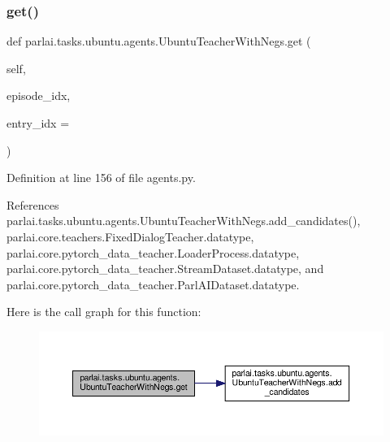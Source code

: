 \subsubsection{\texorpdfstring{get()}{get()}}
{\footnotesize\ttfamily def parlai.\+tasks.\+ubuntu.\+agents.\+Ubuntu\+Teacher\+With\+Negs.\+get (\begin{DoxyParamCaption}\item[{}]{self,  }\item[{}]{episode\+\_\+idx,  }\item[{}]{entry\+\_\+idx = {} }\end{DoxyParamCaption})}



Definition at line 156 of file agents.\+py.



References parlai.\+tasks.\+ubuntu.\+agents.\+Ubuntu\+Teacher\+With\+Negs.\+add\+\_\+candidates(), parlai.\+core.\+teachers.\+Fixed\+Dialog\+Teacher.\+datatype, parlai.\+core.\+pytorch\+\_\+data\+\_\+teacher.\+Loader\+Process.\+datatype, parlai.\+core.\+pytorch\+\_\+data\+\_\+teacher.\+Stream\+Dataset.\+datatype, and parlai.\+core.\+pytorch\+\_\+data\+\_\+teacher.\+Parl\+A\+I\+Dataset.\+datatype.

Here is the call graph for this function\+:
\nopagebreak
\begin{figure}[H]
\begin{center}
\leavevmode
\includegraphics[width=350pt]{classparlai_1_1tasks_1_1ubuntu_1_1agents_1_1UbuntuTeacherWithNegs_a47304c2339835e7942ae190d4b17fc2d_cgraph}
\end{center}
\end{figure}
\mbox{\label{classparlai_1_1tasks_1_1ubuntu_1_1agents_1_1UbuntuTeacherWithNegs_aef77d69155c1215eb64ec5c1ba895bdf}} 
